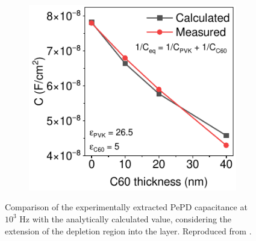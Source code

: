 \begin{figure}[ht!]
    \centering
    
    \begin{subfigure}[t]{0.45\textwidth}
        \centering
        \includegraphics[width=\textwidth]{chapters/transport_layers/images/C_f_c60_thick.pdf} %
    \end{subfigure}
    \caption[Comparison of the experimentally extracted PePD capacitance with the analytically calculated values.]{Comparison of the experimentally extracted PePD capacitance at $10^3$ Hz with the analytically calculated value, considering the extension of the depletion region into the  layer. Reproduced from \cite{Papadopoulou2025ElectronSpeed}.}
    \label{fig:etl_opt:capacitance_numerical_measured}
\end{figure}




